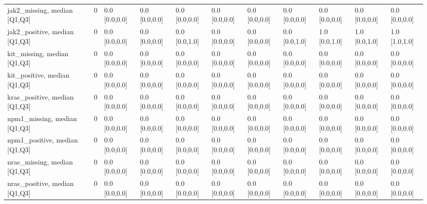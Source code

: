 \begin{tabular}{llllllllllll}
jak2\_missing, median [Q1,Q3] &    &                    0 &       0.0 [0.0,0.0] &      0.0 [0.0,0.0] &        0.0 [0.0,0.0] &       0.0 [0.0,0.0] &     0.0 [0.0,0.0] &     0.0 [0.0,0.0] &     0.0 [0.0,0.0] &       0.0 [0.0,0.0] &        0.0 [0.0,0.0] \\
jak2\_positive, median [Q1,Q3] &    &                    0 &       0.0 [0.0,0.0] &      0.0 [0.0,0.0] &        0.0 [0.0,1.0] &       0.0 [0.0,0.0] &     0.0 [0.0,0.0] &     0.0 [0.0,1.0] &     1.0 [0.0,1.0] &       1.0 [0.0,1.0] &        1.0 [1.0,1.0] \\
kit\_missing, median [Q1,Q3] &    &                    0 &       0.0 [0.0,0.0] &      0.0 [0.0,0.0] &        0.0 [0.0,0.0] &       0.0 [0.0,0.0] &     0.0 [0.0,0.0] &     0.0 [0.0,0.0] &     0.0 [0.0,0.0] &       0.0 [0.0,0.0] &        0.0 [0.0,0.0] \\
kit\_positive, median [Q1,Q3] &    &                    0 &       0.0 [0.0,0.0] &      0.0 [0.0,0.0] &        0.0 [0.0,0.0] &       0.0 [0.0,0.0] &     0.0 [0.0,0.0] &     0.0 [0.0,0.0] &     0.0 [0.0,0.0] &       0.0 [0.0,0.0] &        0.0 [0.0,0.0] \\
kras\_positive, median [Q1,Q3] &    &                    0 &       0.0 [0.0,0.0] &      0.0 [0.0,0.0] &        0.0 [0.0,0.0] &       0.0 [0.0,0.0] &     0.0 [0.0,0.0] &     0.0 [0.0,0.0] &     0.0 [0.0,0.0] &       0.0 [0.0,0.0] &        0.0 [0.0,0.0] \\
npm1\_missing, median [Q1,Q3] &    &                    0 &       0.0 [0.0,0.0] &      0.0 [0.0,0.0] &        0.0 [0.0,0.0] &       0.0 [0.0,0.0] &     0.0 [0.0,0.0] &     0.0 [0.0,0.0] &     0.0 [0.0,0.0] &       0.0 [0.0,0.0] &        0.0 [0.0,0.0] \\
npm1\_positive, median [Q1,Q3] &    &                    0 &       0.0 [0.0,0.0] &      0.0 [0.0,0.0] &        0.0 [0.0,0.0] &       0.0 [0.0,0.0] &     0.0 [0.0,0.0] &     0.0 [0.0,0.0] &     0.0 [0.0,0.0] &       0.0 [0.0,0.0] &        0.0 [0.0,0.0] \\
nras\_missing, median [Q1,Q3] &    &                    0 &       0.0 [0.0,0.0] &      0.0 [0.0,0.0] &        0.0 [0.0,0.0] &       0.0 [0.0,0.0] &     0.0 [0.0,0.0] &     0.0 [0.0,0.0] &     0.0 [0.0,0.0] &       0.0 [0.0,0.0] &        0.0 [0.0,0.0] \\
nras\_positive, median [Q1,Q3] &    &                    0 &       0.0 [0.0,0.0] &      0.0 [0.0,0.0] &        0.0 [0.0,0.0] &       0.0 [0.0,0.0] &     0.0 [0.0,0.0] &     0.0 [0.0,0.0] &     0.0 [0.0,0.0] &       0.0 [0.0,0.0] &        0.0 [0.0,0.0] \\

\end{tabular}
